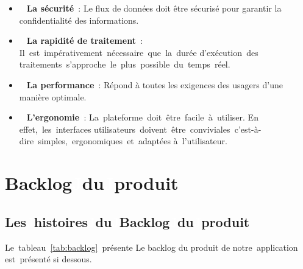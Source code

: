 \begin{itemize}
\begin{itemize}[label=--]
\item\textcolor{white}{J} \textbf{La sécurité}\textcolor{white}{J}: Le flux de données doit être sécurisé pour garantir la confidentialité des informations. 
\item\textcolor{white}{J} \textbf{La rapidité de traitement}\textcolor{white}{J}:
Il\textcolor{white}{J}est\textcolor{white}{J}impérativement\textcolor{white}{J}nécessaire\textcolor{white}{J}que\textcolor{white}{J}la\textcolor{white}{J}durée d’exécution\textcolor{white}{J}des traitements\textcolor{white}{J}s’approche\textcolor{white}{J}le\textcolor{white}{J}plus\textcolor{white}{J}possible\textcolor{white}{J}du\textcolor{white}{J}temps\textcolor{white}{J}réel. 
\item\textcolor{white}{J} \textbf{La performance}\textcolor{white}{J}:
Répond à toutes les exigences des usagers d’une manière optimale. 
\item\textcolor{white}{J} \textbf{L’ergonomie}\textcolor{white}{J}:
La\textcolor{white}{J}plateforme\textcolor{white}{J}doit\textcolor{white}{J}être\textcolor{white}{J}facile\textcolor{white}{J}à\textcolor{white}{J}utiliser. En effet,\textcolor{white}{J}les\textcolor{white}{J}interfaces utilisateurs\textcolor{white}{J}doivent\textcolor{white}{J}être\textcolor{white}{J}conviviales\textcolor{white}{J}c’est-à-dire\textcolor{white}{J}simples,\textcolor{white}{J}ergonomiques\textcolor{white}{J}et\textcolor{white}{J}adaptées à\textcolor{white}{J}l’utilisateur.
\end{itemize}
\end{itemize}

\section{Backlog\textcolor{white}{J}du\textcolor{white}{J}produit}
\subsection{Les\textcolor{white}{J}histoires\textcolor{white}{J}du\textcolor{white}{J}Backlog\textcolor{white}{J}du\textcolor{white}{J}produit}
Le\textcolor{white}{J}tableau\textcolor{white}{J}\ref{tab:backlog}\textcolor{white}{J}présente Le backlog du produit de notre\textcolor{white}{J}application est\textcolor{white}{J}présenté si dessous.

